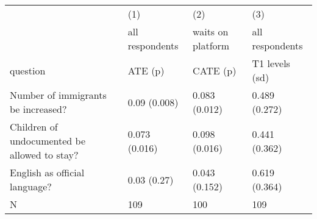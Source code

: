 \begin{tabular}{llll}
  \hline
  \hline
 & (1) & (2) & (3) \\ 
   & all respondents & waits on platform & all respondents \\ 
  question & ATE (p) & CATE (p) & T1 levels (sd) \\ 
  Number of immigrants be increased? & 0.09 (0.008) & 0.083 (0.012) & 0.489 (0.272) \\ 
  Children of undocumented be allowed to stay? & 0.073 (0.016) & 0.098 (0.016) & 0.441 (0.362) \\ 
  English as official language? & 0.03 (0.27) & 0.043 (0.152) & 0.619 (0.364) \\ 
  N & 109 & 100 & 109 \\ 
   \hline
\end{tabular}

